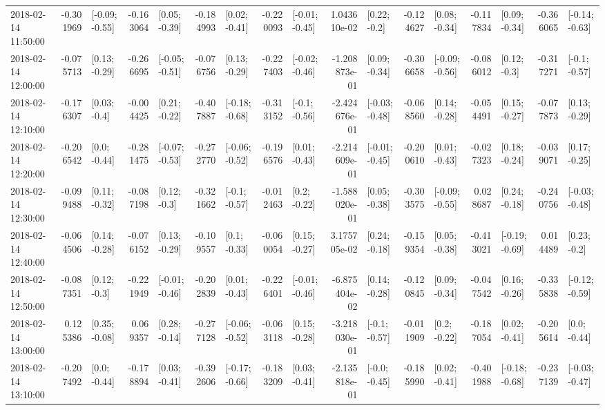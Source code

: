 \begin{tabular}{lrlrlrlrlrlrlrlrl}
2018-02-14 11:50:00 & -0.301969 &  [-0.09; -0.55] & -0.163064 &   [0.05; -0.39] & -0.184993 &   [0.02; -0.41] & -0.220093 &  [-0.01; -0.45] &  1.043610e-02 &    [0.22; -0.2] & -0.124627 &   [0.08; -0.34] & -0.117834 &   [0.09; -0.34] & -0.366065 &  [-0.14; -0.63] \\
2018-02-14 12:00:00 & -0.075713 &   [0.13; -0.29] & -0.266695 &  [-0.05; -0.51] & -0.076756 &   [0.13; -0.29] & -0.227403 &  [-0.02; -0.46] & -1.208873e-01 &   [0.09; -0.34] & -0.306658 &  [-0.09; -0.56] & -0.086012 &    [0.12; -0.3] & -0.317271 &   [-0.1; -0.57] \\
2018-02-14 12:10:00 & -0.176307 &    [0.03; -0.4] & -0.004425 &   [0.21; -0.22] & -0.407887 &  [-0.18; -0.68] & -0.313152 &   [-0.1; -0.56] & -2.424676e-01 &  [-0.03; -0.48] & -0.068560 &   [0.14; -0.28] & -0.054491 &   [0.15; -0.27] & -0.077873 &   [0.13; -0.29] \\
2018-02-14 12:20:00 & -0.206542 &    [0.0; -0.44] & -0.281475 &  [-0.07; -0.53] & -0.272770 &  [-0.06; -0.52] & -0.196576 &   [0.01; -0.43] & -2.214609e-01 &  [-0.01; -0.45] & -0.200610 &   [0.01; -0.43] & -0.027323 &   [0.18; -0.24] & -0.039071 &   [0.17; -0.25] \\
2018-02-14 12:30:00 & -0.099488 &   [0.11; -0.32] & -0.087198 &    [0.12; -0.3] & -0.321662 &   [-0.1; -0.57] & -0.012463 &    [0.2; -0.22] & -1.588020e-01 &   [0.05; -0.38] & -0.303575 &  [-0.09; -0.55] &  0.028687 &   [0.24; -0.18] & -0.240756 &  [-0.03; -0.48] \\
2018-02-14 12:40:00 & -0.064506 &   [0.14; -0.28] & -0.076152 &   [0.13; -0.29] & -0.109557 &    [0.1; -0.33] & -0.060054 &   [0.15; -0.27] &  3.175705e-02 &   [0.24; -0.18] & -0.159354 &   [0.05; -0.38] & -0.413021 &  [-0.19; -0.69] &  0.014489 &    [0.23; -0.2] \\
2018-02-14 12:50:00 & -0.087351 &    [0.12; -0.3] & -0.221949 &  [-0.01; -0.46] & -0.202839 &   [0.01; -0.43] & -0.226401 &  [-0.01; -0.46] & -6.875404e-02 &   [0.14; -0.28] & -0.120845 &   [0.09; -0.34] & -0.047542 &   [0.16; -0.26] & -0.335838 &  [-0.12; -0.59] \\
2018-02-14 13:00:00 &  0.125386 &   [0.35; -0.08] &  0.069357 &   [0.28; -0.14] & -0.277128 &  [-0.06; -0.52] & -0.063118 &   [0.15; -0.28] & -3.218030e-01 &   [-0.1; -0.57] & -0.011909 &    [0.2; -0.22] & -0.187054 &   [0.02; -0.41] & -0.205614 &    [0.0; -0.44] \\
2018-02-14 13:10:00 & -0.207492 &    [0.0; -0.44] & -0.178894 &   [0.03; -0.41] & -0.392606 &  [-0.17; -0.66] & -0.183209 &   [0.03; -0.41] & -2.135818e-01 &   [-0.0; -0.45] & -0.185990 &   [0.02; -0.41] & -0.401988 &  [-0.18; -0.68] & -0.237139 &  [-0.03; -0.47] \\

\end{tabular}
